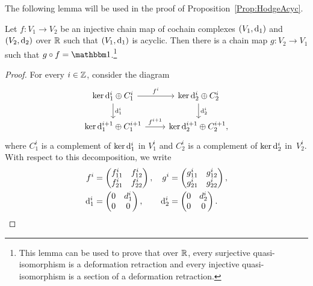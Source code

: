 \documentclass[\MainFolder/Text.tex]{subfiles}
\begin{document}
The following lemma will be used in the proof of Proposition~\ref{Prop:HodgeAcyc}.

\begin{Lemma}\label{Lem:Pom}
Let $f: V_1 \rightarrow V_2$ be an injective chain map of cochain complexes $(V_1,\mathrm{d}_1)$ and $(V_2,\mathrm{d}_2)$ over $\mathbb{R}$ such that $(V_1,\mathrm{d}_1)$ is acyclic. Then there is a chain map $g: V_2 \rightarrow V_1$ such that $g\circ f=\Id$.\footnote{This lemma can be used to prove that over $\mathbb{R}$, every surjective quasi-isomorphism is a deformation retraction and every injective quasi-isomorphism is a section of a deformation retraction.}
\end{Lemma}

\begin{proof}
For every $i\in \mathbb{Z}$, consider the diagram
\[\begin{tikzcd}
\Ker \Dd_1^i \oplus C^i_1 \arrow{r}{f^i} \arrow{d}{\Dd_1^i} & \Ker \Dd_2^i \oplus C^i_2 \arrow{d}{\Dd_2^i} \\
\Ker \Dd^{i+1}_1 \oplus C^{i+1}_1 \arrow{r}{f^{i+1}} & \Ker \Dd_2^{i+1} \oplus C^{i+1}_2,
\end{tikzcd}\]
where $C^i_1$ is a complement of $\operatorname{ker} \mathrm{d}_1^i$ in $V_1^i$ and $C^i_2$ is a complement of $\operatorname{ker} \mathrm{d}_2^i$ in~$V_2^i$. With respect to this decomposition, we write
\begin{align*}
f^i & = \begin{pmatrix}
f^{i}_{11} & f^i_{12} \\
f^{i}_{21} & f^i_{22}
\end{pmatrix},  & g^i &= \begin{pmatrix}
g^{i}_{11} & g^i_{12} \\
g^{i}_{21} & g^i_{22}
\end{pmatrix}, \\
\mathrm{d}^i_1 &= \begin{pmatrix}
0 & d^i_1 \\
0 & 0
\end{pmatrix},& \mathrm{d}^i_2 &= \begin{pmatrix}
0 & d^i_2 \\
0 & 0
\end{pmatrix}.
\end{align*}


\end{proof}
\end{document}
